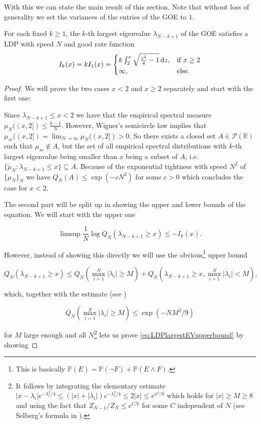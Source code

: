 With this we can state the main result of this section. Note that without loss of generality we set the variances of the entries of the GOE to $1$.
\begin{theorem}
	For each fixed $k\geq 1$, the $k$-th largest eigenvalue $\lambda_{N-k+1}$ of the GOE satisfies a LDP with speed $N$ and good rate function
	$$I_k(x)=kI_1(x)=\begin{cases}
						k\int_2^x\sqrt{\frac{z^2}{4}-1}\mathop{}\!\mathrm{d} z, &\mbox{if } x\geq 2 \\
						\infty, &\mbox{else.}
					  \end{cases}$$
\end{theorem}
\begin{proof}
	We will prove the two cases $x<2$ and $x\geq 2$ separately and start with the first one:
	
	Since $\lambda_{N-k+1}\leq x<2$ we have that the empirical spectral measure $\mu_N((x,2])\leq \frac{k-1}{N}$. However, Wigner's semicircle law implies that $\mu_{sc}((x,2])=\lim_{N\rightarrow\infty} \mu_N((x,2])>0$. So there exists a closed set $A\in\mathcal P(\mathbb R)$ such that $\mu_{sc}\notin A$, but the set of all empirical spectral distributions with $k$-th largest eigenvalue being smaller than $x$ being a subset of $A$, i.e. $\{\tilde \mu_N:\lambda_{N-k+1}\leq x\}\subseteq A$. Because of the exponential tightness with speed $N^2$ of $\{\mu_N\}_N$ we have $Q_N(A)\leq\exp(-cN^2)$ for some $c>0$ which concludes the case for $x<2$.
	
	The second part will be split up in showing the upper and lower bounds of the equation. We will start with the upper one
	
	\begin{equation}\label{eq:LDPlargestEVupperbound}
		\limsup \frac{1}{N}\log Q_N(\lambda_{N-k+1}\geq x)\leq -I_k(x).
	\end{equation}
	
	However, instead of showing this directly we will use the obvious\footnote{This is basically $\mathbb P(E)=\mathbb P(\neg F)+\mathbb P(E\land F)$.} upper bound
	
	$$Q_N(\lambda_{N-k+1}\geq x)\leq Q_N(\max_{i=1}^N |\lambda_i|\geq M)+ Q_N(\lambda_{N-k+1}\geq x,\max_{i=1}^N|\lambda_i|<M),$$
	
	which, together with the estimate (see \cite{ArousAging})
	
	$$Q_N(\max_{i=1}^N|\lambda_i|\geq M)\leq \exp(-NM^2/9)$$
	
	for $M$ large enough and all $N$\footnote{It follows by integrating the elementary estimate $|x-\lambda_i|e^{-\lambda_i^2/4}\leq (|x|+|\lambda_i|)e^{-\lambda_i^2/4}\leq 2|x|\leq e^{x^2/8}$ which holds for $|x|\geq M \geq 8$ and using the fact that $Z_{N-1}/Z_N\leq e^{CN}$ for some $C$ independent of $N$ (see Selberg's formula in \cite{Mehta2004random}).} lets us prove \ref{eq:LDPlargestEVupperbound} by showing
	

\end{proof}
